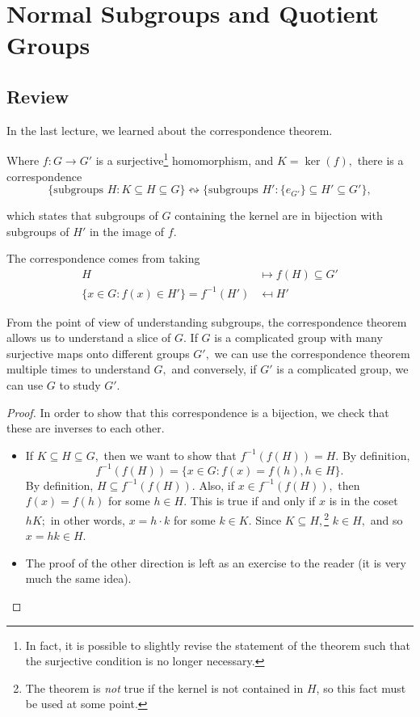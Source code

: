 \newpage


\section{Normal Subgroups and Quotient Groups}
\subsection{Review}
In the last lecture, we learned about the correspondence theorem. 

\begin{theorem}
Where $f: G \rightarrow G'$ is a surjective\footnote{In fact, it is possible to slightly revise the statement of the theorem such that the surjective condition is no longer necessary.} homomorphism, and $K = \ker(f),$ there is a correspondence 
\[
\{\text{subgroups } H: K \subseteq H \subseteq G\} \leftrightsquigarrow \{\text{subgroups } H' : \{e_{G'}\} \subseteq H' \subseteq G'\},
\]

which states that subgroups of $G$ containing the kernel are in bijection with subgroups of $H'$ in the image of $f.$
\end{theorem}

The correspondence comes from taking 
\begin{align*}
H &\mapsto f(H) \subseteq G' \\
\{x \in G : f(x) \in H'\} = f^{-1}(H') &\mapsfrom H'
\end{align*}

From the point of view of understanding subgroups, the correspondence theorem allows us to understand a slice of $G.$ If $G$ is a complicated group with many surjective maps onto different groups $G',$ we can use the correspondence theorem multiple times to understand $G,$ and conversely, if $G'$ is a complicated group, we can use $G$ to study $G'.$ 

\begin{proof}
In order to show that this correspondence is a bijection, we check that these are inverses to each other. 
\begin{itemize}
    \item If $K \subseteq H \subseteq G,$ then we want to show that $f^{-1}(f(H)) = H.$ By definition, 
    \[ 
    f^{-1}(f(H)) = \{x \in G : f(x) = f(h), h \in H\}.
    \]
    By definition, $H \subseteq f^{-1}(f(H)).$ Also, if $x \in f^{-1}(f(H)),$ then $f(x) = f(h)$ for some $h \in H.$ This is true if and only if $x$ is in the coset $hK;$ in other words, $x = h\cdot k$ for some $k \in K.$ Since $K \subseteq H,$\footnote{The theorem is \emph{not} true if the kernel is not contained in $H$, so this fact must be used at some point.} $k \in H,$ and so $x = hk \in H.$ 
    \item The proof of the other direction is left as an exercise to the reader (it is very much the same idea).  
\end{itemize}
\end{proof}


